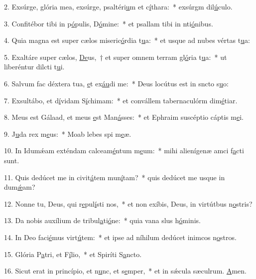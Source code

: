 2. Exsúrge, glória mea, exsúrge, psaltéri\uline{u}m et c\uline{í}thara:~* exsúrgm dil\uline{ú}culo.\par 
3. Confitébor tibi in p\uline{ó}pulis, D\uline{ó}mine:~* et psallam tibi in nti\uline{ó}nibus.\par 
4. Quia magna est super cælos miseric\uline{ó}rdia t\uline{u}a:~* et usque ad nubes vértas t\uline{u}a:\par 
5. Exaltáre super cælos, \uline{De}us,~† et super omnem terram gl\uline{ó}ria t\uline{u}a:~* ut liberéntur dilcti t\uline{u}i.\par 
6. Salvum fac déxtera tua, \uline{e}t ex\uline{áu}di me:~* Deus locútus est in sncto s\uline{u}o:\par 
7. Exsultábo, et d\uline{í}vidam S\uline{í}chimam:~* et convállem tabernaculórm dim\uline{é}tiar.\par 
8. Meus est Gálaad, et meus \uline{e}st Man\uline{á}sses:~* et Ephraim suscéptio cáptis m\uline{e}i.\par 
9. J\uline{u}da rex m\uline{e}us:~* Moab lebes spi m\uline{e}æ.\par 
10. In Idumǽam exténdam calceam\uline{é}ntum m\uline{e}um:~* mihi alienígenæ amci f\uline{a}cti sunt.\par 
11. Quis dedúcet me in civit\uline{á}tem mun\uline{í}tam?~* quis dedúcet me usque in dum\uline{ǽ}am?\par 
12. Nonne tu, Deus, qui r\uline{e}pul\uline{í}sti nos,~* et non exíbis, Deus, in virtútbus n\uline{o}stris?\par 
13. Da nobis auxílium de tribul\uline{a}ti\uline{ó}ne:~* quia vana slus h\uline{ó}minis.\par 
14. In Deo faci\uline{é}mus virt\uline{ú}tem:~* et ipse ad níhilum dedúcet inimcos n\uline{o}stros.\par 
15. Glória P\uline{a}tri, et F\uline{í}lio,~* et Spiríti S\uline{a}ncto.\par 
16. Sicut erat in princípio, et n\uline{u}nc, et s\uline{e}mper,~* et in sǽcula sæculrum. \uline{A}men.\par 
